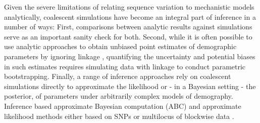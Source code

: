 \documentclass[graybox]{svmult}
\begin{document}
Given the severe limitations of relating sequence variation to
mechanistic models analytically, coalescent simulations have become an
integral part of inference in a number of ways: First, comparisons
between analytic results against simulations serve as an important
sanity check for both. Second, while it is often possible to use
analytic approaches to obtain unbiased point estimates of demographic
parameters by ignoring linkage \citep{gutenkunst2009inferring}, quantifying the uncertainty and potential biases in such estimates requires simulating
data with linkage to conduct parametric bootstrapping. Finally, a range
of inference approaches rely on coalescent simulations directly to
approximate the likelihood or - in a Bayesian setting - the posterior,
of parameters under arbitrarily complex models of demography. Inference based approximate Bayesian computation (ABC) \citep{Beaumont2002, Cornuet2008} and approximate likelihood methods either based on SNPs \citep{excoffier2013} or multilocus of blockwise data \citep{becquet2007new, Beeravolu2017}.
\end{document}
